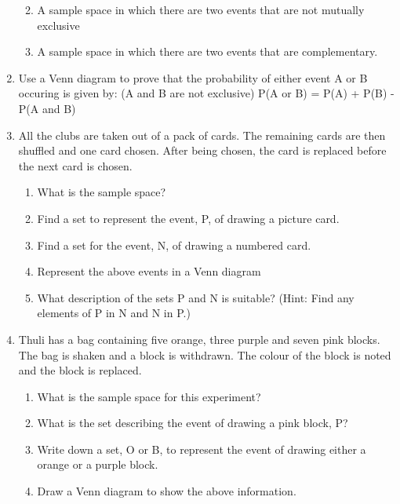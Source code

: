 \begin{enumerate}[noitemsep, label=\textbf{\arabic*}. ]
\begin{enumerate}[noitemsep, label=\textbf{\alph*}. ]
            \label{m39373*uid145}\item A sample space in which there are
two events that are not mutually exclusive
\label{m39373*uid146}\item A sample space in which there are two events that are
complementary.
\end{enumerate}
                \label{m39373*uid147}\item Use a Venn diagram to prove that the probability of
either event A or B occuring is given by: (A and B are not exclusive)
P(A or B) = P(A) + P(B) - P(A and B)\newline
            
\label{m39373*uid148}\item All the clubs are taken out of a pack of cards. The
remaining cards are then shuffled and one card chosen. After being chosen, the
card is replaced before the next card is chosen.
\label{m39373*id116505}\begin{enumerate}[noitemsep, label=\textbf{\alph*}. ] 
            \label{m39373*uid149}\item What is the sample space?
\label{m39373*uid150}\item Find a set to represent the event, P, of drawing a
picture card.
\label{m39373*uid151}\item Find a set for the event, N, of drawing a numbered
card.
\label{m39373*uid152}\item Represent the above events in a Venn diagram
\label{m39373*uid153}\item What description of the sets P and N is suitable?
(Hint: Find any elements of P in N and N in P.)
\end{enumerate}
                \label{m39373*uid154}\item Thuli has a bag containing five orange, three purple
and seven pink blocks. The bag is shaken and a block is withdrawn. The colour of
the block is noted and the block is replaced.
\label{m39373*id116586}\begin{enumerate}[noitemsep, label=\textbf{\alph*}. ] 
            \label{m39373*uid155}\item What is the sample space for this
experiment?
\label{m39373*uid156}\item What is the set describing the event of drawing a pink
block, P?
\label{m39373*uid157}\item Write down a set, O or B, to represent the event of
drawing either a orange or a purple block.
\label{m39373*uid158}\item Draw a Venn diagram to show the above information.
\end{enumerate}
                \end{enumerate}
        
